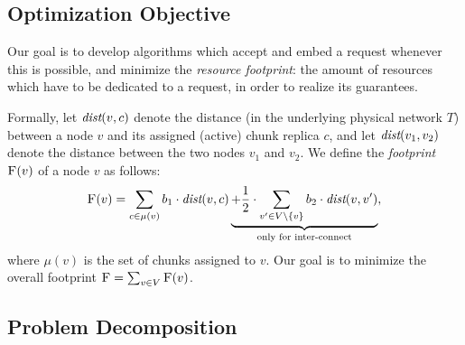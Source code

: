\documentclass[conference,10pt]{IEEEtran}
\newcommand{\stefan}[1]{\textcolor{blue}{stefan: #1}}
\newcommand{\VirtualNodes}{\ensuremath{V}}
\newcommand{\achunk}{\ensuremath{c}}
\newcommand{\dist}{\emph{dist}}
\newcommand{\Cost}{\textsc{F}}
\newcommand{\Tree}{\ensuremath{T}}
\newcommand{\CostTrans}{\ensuremath{b_1}}
\newcommand{\CostCom}{\ensuremath{b_2}}
\begin{document}



\subsection{Optimization Objective}

Our goal is to develop algorithms which 
accept and embed a request
whenever this is possible, and minimize the \emph{resource footprint}: the amount of resources which have to be dedicated to a request, in order to realize its guarantees.

Formally, let $\dist(v,\achunk)$ denote the distance (in the underlying physical network $\Tree$) between a node $v$ and
its assigned (active) chunk replica $\achunk$, and let $\dist(v_1,v_2)$ denote the distance between the two nodes $v_1$ and $v_2$.
We define the \emph{footprint} $\Cost(v)$ of a node $v$ as follows:
$$
\Cost(v) = \sum_{\achunk\in \mu(v)} \CostTrans \cdot \dist(v,\achunk) \underbrace{+ \frac{1}{2} \cdot \sum_{v' \in \VirtualNodes\setminus\{v\}} \CostCom \cdot \dist(v,v')}_{\text{only for inter-connect}},
$$
 where $\mu(v)$ is the set of chunks assigned to $v$. Our goal is to minimize the overall footprint
$\Cost=\sum_{v\in V} \Cost(v)$.


\subsection{Problem Decomposition}
\end{document}
